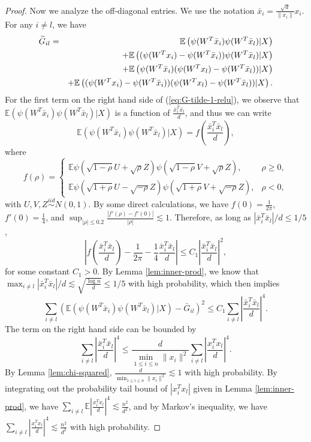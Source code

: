 \begin{proof}
Now we analyze the off-diagonal entries. We use the notation $\bar{x}_i=\frac{\sqrt{d}}{\|x_i\|}x_i$. For any $i\neq l$, we have
\begin{eqnarray}
\label{eq:G-tilde-1-relu} \wt{G}_{il} &=& \mathbb{E}\left(\psi(W^T\bar{x}_i)\psi(W^T\bar{x}_l)|X\right) \\
\label{eq:G-tilde-2-relu} && + \mathbb{E}\left((\psi(W^Tx_i)-\psi(W^T\bar{x}_i))\psi(W^T\bar{x}_l)|X\right) \\
\label{eq:G-tilde-3-relu} && + \mathbb{E}\left(\psi(W^T\bar{x}_i)(\psi(W^Tx_l)-\psi(W^T\bar{x}_l))|X\right) \\
\label{eq:G-tilde-4-relu} && + \mathbb{E}\left((\psi(W^Tx_i)-\psi(W^T\bar{x}_i))(\psi(W^Tx_l)-\psi(W^T\bar{x}_l))|X\right).
\end{eqnarray}
For the first term on the right hand side of (\ref{eq:G-tilde-1-relu}), we observe that $\mathbb{E}\left(\psi(W^T\bar{x}_i)\psi(W^T\bar{x}_l)|X\right)$ is a function of $\frac{\bar{x}_i^T\bar{x}_l}{d}$, and thus we can write
$$\mathbb{E}\left(\psi(W^T\bar{x}_i)\psi(W^T\bar{x}_l)|X\right)=f\left(\frac{\bar{x}_i^T\bar{x}_l}{d}\right),$$
where
$$f(\rho) = \begin{cases}
\mathbb{E}\psi(\sqrt{1-\rho}U+\sqrt{\rho}Z)\psi(\sqrt{1-\rho}V+\sqrt{\rho}Z), & \rho \geq 0, \\
\mathbb{E}\psi(\sqrt{1+\rho}U-\sqrt{-\rho}Z)\psi(\sqrt{1+\rho}V+\sqrt{-\rho}Z), & \rho < 0,
\end{cases}$$
with $U,V,Z\stackrel{iid}{\sim} N(0,1)$. By some direct calculations, we have $f(0)=\frac{1}{2\pi}$, $f'(0)=\frac{1}{4}$, and $\sup_{|\rho|\leq 0.2}\frac{|f'(\rho)-f'(0)|}{|\rho|}\lesssim 1$. Therefore, as long as $|\bar{x}_i^T\bar{x}_l|/d\leq 1/5$,
$$\left|f\left(\frac{\bar{x}_i^T\bar{x}_l}{d}\right)-\frac{1}{2\pi}-\frac{1}{4}\frac{\bar{x}_i^T\bar{x}_l}{d}\right|\leq C_1\left|\frac{\bar{x}_i^T\bar{x}_l}{d}\right|^2,$$
for some constant $C_1>0$. By Lemma \ref{lem:inner-prod}, we know that $\max_{i\neq l}|\bar{x}_i^T\bar{x}_l|/d\lesssim \sqrt{\frac{\log n}{d}}\leq 1/5$ with high probability, which then implies
\begin{equation}
\sum_{i\neq l}\left(\mathbb{E}\left(\psi(W^T\bar{x}_i)\psi(W^T\bar{x}_l)|X\right)-\bar{G}_{il}\right)^2 \leq C_1\sum_{i\neq l}\left|\frac{\bar{x}_i^T\bar{x}_l}{d}\right|^4.\label{eq:4th-bd-later}
\end{equation}
The term on the right hand side can be bounded by
$$\sum_{i\neq l}\left|\frac{\bar{x}_i^T\bar{x}_l}{d}\right|^4\leq \frac{d}{\min_{1\leq i\leq n}\|x_i\|^2}\sum_{i\neq l}\left|\frac{x_i^Tx_l}{d}\right|^4.$$
By Lemma \ref{lem:chi-squared}, $\frac{d}{\min_{1\leq i\leq n}\|x_i\|^2}\lesssim 1$ with high probability. By integrating out the probability tail bound of $|x_i^Tx_l|$ given in Lemma \ref{lem:inner-prod}, we have $\sum_{i\neq l}\mathbb{E}\left|\frac{x_i^Tx_l}{d}\right|^4\lesssim \frac{n^2}{d^2}$, and by Markov's inequality, we have $\sum_{i\neq l}\left|\frac{x_i^Tx_l}{d}\right|^4\lesssim \frac{n^2}{d^2}$ with high probability.


\end{proof}
